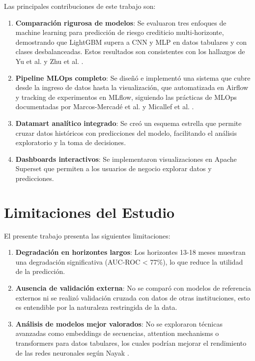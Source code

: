 Las principales contribuciones de este trabajo son:

\begin{enumerate}
    \item \textbf{Comparación rigurosa de modelos}: Se evaluaron tres enfoques de machine learning para predicción de riesgo crediticio multi-horizonte, demostrando que LightGBM supera a CNN y MLP en datos tabulares y con clases desbalanceadas. Estos resultados son consistentes con los hallazgos de Yu et al. \cite{yu2024advanced} y Zhu et al. \cite{zhu2024ensemble}.
    
    \item \textbf{Pipeline MLOps completo}: Se diseñó e implementó una sistema que cubre desde la ingreso de datos hasta la visualización, que automatizada en Airflow y tracking de experimentos en MLflow, siguiendo las prácticas de MLOps documentadas por Marcos-Mercadé et al. \cite{marcos2026empirical} y Micallef et al. \cite{micallef2026systematic}.
    
    \item \textbf{Datamart analítico integrado}: Se creó un esquema estrella que permite cruzar datos históricos con predicciones del modelo, facilitando el análisis exploratorio y la toma de decisiones.
    
    \item \textbf{Dashboards interactivos}: Se implementaron visualizaciones en Apache Superset que permiten a los usuarios de negocio explorar datos y predicciones.
\end{enumerate}

\section{Limitaciones del Estudio}

El presente trabajo presenta las siguientes limitaciones:

\begin{enumerate}
    \item \textbf{Degradación en horizontes largos}: Los horizontes 13-18 meses muestran una degradación significativa (AUC-ROC < 77\%), lo que reduce la utilidad de la predicción.
    
    \item \textbf{Ausencia de validación externa}: No se comparó con modelos de referencia externos ni se realizó validación cruzada con datos de otras instituciones, esto es entendible por la naturaleza restringida de la data.
    
    \item \textbf{Análisis de modelos mejor valorados}: No se exploraron técnicas avanzadas como embeddings de secuencias, attention mechanisms o transformers para datos tabulares, los cuales podrían mejorar el rendimiento de las redes neuronales según Nayak \cite{nayak2026calibrated}.
\end{enumerate}

